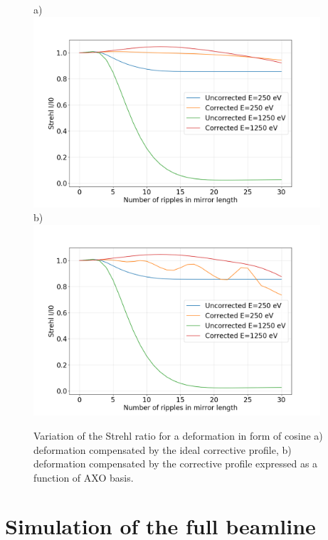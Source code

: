 \documentclass{iucr}              %
\begin{document}
  \begin{figure}
  \begin{flushleft}
  a)\\
  \includegraphics[width=0.95\textwidth]{figures/flexon_ken_memo2_cosine.png} \\
  b)\\
  \includegraphics[width=0.95\textwidth]{figures/flexon_ken_memo2_cosine_fit.png} \\
  \end{flushleft}

  \caption
  { \label{fig:strehlRatioCosine} 
Variation of the Strehl ratio for a deformation in form of cosine a) deformation compensated by the ideal corrective profile, b) deformation compensated by the corrective profile expressed as a function of AXO basis.
}
  \end{figure} 
  
  


\section{Simulation of the full beamline}
\end{document}
